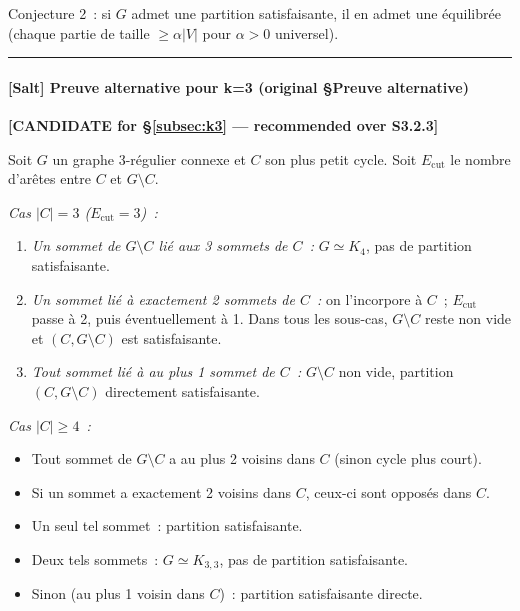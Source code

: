 Conjecture 2~: si $G$ admet une partition satisfaisante, il en admet une équilibrée
(chaque partie de taille $\geq \alpha |V|$ pour $\alpha > 0$ universel).

\bigskip\hrule\bigskip

\paragraph{[Salt] Preuve alternative pour k=3 (original §Preuve alternative)}
\textbf{[CANDIDATE for §\ref{subsec:k3} — recommended over S3.2.3]}

Soit $G$ un graphe 3-régulier connexe et $C$ son plus petit cycle.
Soit $E_{\text{cut}}$ le nombre d'arêtes entre $C$ et $G \setminus C$.

\medskip\textit{Cas $|C| = 3$ ($E_{\text{cut}} = 3$)~:}
\begin{enumerate}
    \item \textit{Un sommet de $G \setminus C$ lié aux 3 sommets de $C$~:}
          $G \simeq K_4$, pas de partition satisfaisante.
    \item \textit{Un sommet lié à exactement 2 sommets de $C$~:}
          on l'incorpore à $C$~; $E_{\text{cut}}$ passe à 2, puis éventuellement à 1.
          Dans tous les sous-cas, $G \setminus C$ reste non vide et $(C, G \setminus C)$
          est satisfaisante.
    \item \textit{Tout sommet lié à au plus 1 sommet de $C$~:}
          $G \setminus C$ non vide, partition $(C, G \setminus C)$ directement satisfaisante.
\end{enumerate}

\medskip\textit{Cas $|C| \geq 4$~:}
\begin{itemize}
    \item Tout sommet de $G \setminus C$ a au plus 2 voisins dans $C$
          (sinon cycle plus court).
    \item Si un sommet a exactement 2 voisins dans $C$, ceux-ci sont opposés dans $C$.
    \item Un seul tel sommet~: partition satisfaisante.
    \item Deux tels sommets~: $G \simeq K_{3,3}$, pas de partition satisfaisante.
    \item Sinon (au plus 1 voisin dans $C$)~: partition satisfaisante directe.
\end{itemize}


